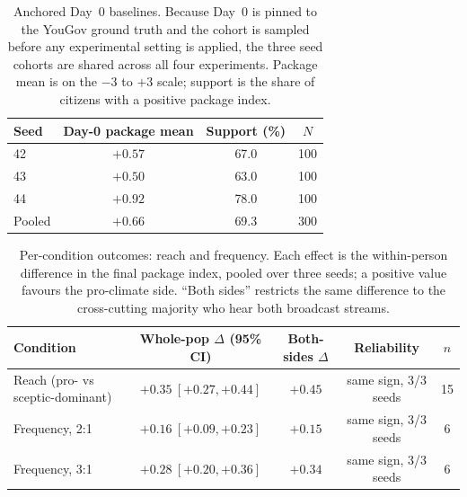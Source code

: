 \documentclass[pdflatex,sn-mathphys-num]{sn-jnl}%
\theoremstyle{thmstyleone}%
\theoremstyle{thmstyletwo}%
\theoremstyle{thmstylethree}%
\begin{document}
\begin{table}[t]
  \centering
  \footnotesize
  \caption{Anchored Day~0 baselines. Because Day~0 is pinned to the YouGov ground
  truth and the cohort is sampled before any experimental setting is applied, the
  three seed cohorts are shared across all four experiments. Package mean is on the
  $-3$ to $+3$ scale; support is the share of citizens with a positive package
  index.}
  \label{tab:si-run-baselines}
  \begin{tabular}{@{}lccc@{}}
    \toprule
    Seed & Day-0 package mean & Support (\%) & $N$ \\
    \midrule
    42 & $+0.57$ & 67.0 & 100 \\
    43 & $+0.50$ & 63.0 & 100 \\
    44 & $+0.92$ & 78.0 & 100 \\
    \midrule
    Pooled & $+0.66$ & 69.3 & 300 \\
    \bottomrule
  \end{tabular}
\end{table}

\begin{table}[t]
  \centering
  \footnotesize
  \caption{Per-condition outcomes: reach and frequency. Each effect is the
  within-person difference in the final package index, pooled over three seeds; a
  positive value favours the pro-climate side. ``Both sides'' restricts the same
  difference to the cross-cutting majority who hear both broadcast streams.}
  \label{tab:si-outcomes-reach-freq}
  \begin{tabular}{@{}lcccc@{}}
    \toprule
    Condition & Whole-pop $\Delta$ (95\% CI) & Both-sides $\Delta$ & Reliability & $n$ \\
    \midrule
    Reach (pro- vs sceptic-dominant) & $+0.35\ [+0.27, +0.44]$ & $+0.45$ & same sign, 3/3 seeds & 15 \\
    Frequency, 2:1 & $+0.16\ [+0.09, +0.23]$ & $+0.15$ & same sign, 3/3 seeds & 6 \\
    Frequency, 3:1 & $+0.28\ [+0.20, +0.36]$ & $+0.34$ & same sign, 3/3 seeds & 6 \\
    \bottomrule
  \end{tabular}
\end{table}
\end{document}
